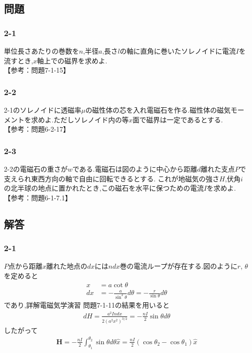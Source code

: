 \subsection*{問題}
\subsubsection*{2-1}
単位長さあたりの巻数を$n$,半径$a$,長さ$l$の軸に直角に巻いたソレノイドに電流$I$を流すとき,$x$軸上での磁界を求めよ.\\
【参考：問題7-1-15】
\subsubsection*{2-2}
2-1のソレノイドに透磁率$\mu$の磁性体の芯を入れ電磁石を作る.磁性体の磁気モーメントを求めよ.ただしソレノイド内の等$x$面で磁界は一定であるとする.\\
【参考：問題6-2-17】
\subsubsection*{2-3}
2-2の電磁石の重さが$w$である.電磁石は図のように中心から距離$d$離れた支点$P$で支えられ東西方向の軸で自由に回転できるとする.
これが地磁気の強さ$H$,伏角$i$の北半球の地点に置かれたとき,この磁石を水平に保つための電流$I$を求めよ.\\
【参考：問題6-1-7.1】
\subsection*{解答}
\subsubsection*{2-1}
$P$点から距離$x$離れた地点の$dx$には$ndx$巻の電流ループが存在する.図のように$r$, $\theta$を定めると
\begin{align*}
  x  & =a\cot\theta                                                 \\
  dx & =-\frac{a}{\sin^2\theta}d\theta=-\frac{r}{\sin\theta}d\theta
\end{align*}
であり,詳解電磁気学演習 問題7-1-11の結果を用いると
\begin{align*}
  dH=\frac{a^2Indx}{2(a^2x^2)^{3/2}}=-\frac{nI}{2}\sin\theta d\theta
\end{align*}
したがって
\begin{align*}
  {\bm H}=-\frac{nI}{2}\int^{\theta_2}_{\theta_1}\sin\theta d\theta\hat{x}=\frac{nI}{2}(\cos\theta_2-\cos\theta_1)\hat{x}
\end{align*}
